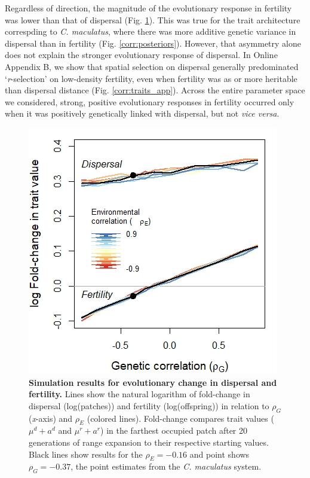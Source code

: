 \documentclass[11pt]{article}
\newcommand{\tom}[1]{{\textit{\color{WildStrawberry}{[#1]}}}}
\begin{document}
Regardless of direction, the magnitude of the evolutionary response in fertility was lower than that of dispersal (Fig. \ref{corr:traits}).
This was true for the trait architecture correspding to \textit{C. maculatus}, where there was more additive genetic variance in dispersal than in fertility (Fig. \ref{corr:posteriors}).
However, that asymmetry alone does not explain the stronger evolutionary response of dispersal.
In Online Appendix B, we show that spatial selection on dispersal generally predominated `\textit{r}-selection’ on low-density fertility, even when fertility was as or more heritable than dispersal distance (Fig. \ref{corr:traits_app}).
Across the entire parameter space we considered, strong, positive evolutionary responses in fertility occurred only when it was positively genetically linked with dispersal, but not \textit{vice versa}. 

\begin{figure}[h!]
\centering
\includegraphics[width=0.5\linewidth]{Figures/trait_change}
\caption{\textbf{Simulation results for evolutionary change in dispersal and fertility.} Lines show the natural logarithm of fold-change in dispersal (log(patches)) and fertility (log(offspring)) in relation to $\rho_{G}$ (\textit{x}-axis) and $\rho_{E}$ (colored lines). 
Fold-change compares trait values ($\mu^{d} + a^{d}$ and $\mu^{r} + a^{r}$) in the farthest occupied patch after 20 generations of range expansion to their respective starting values. 
Black lines show results for the $\rho_{E} = -0.16$ and point shows $\rho_{G} = -0.37$, the point estimates from the \textit{C. maculatus} system.}
\label{corr:traits}
\end{figure}
\end{document}
